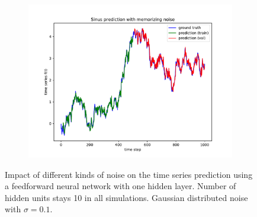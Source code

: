\documentclass{article}
\begin{document}
\begin{figure}
\begin{subfigure}{.35\textwidth}
    \includegraphics[width=\linewidth]{figures/plot_twolayer_memnoise.pdf}
  \end{subfigure}
  \caption{Impact of different kinds of noise on the time series prediction
  using a feedforward neural network with one hidden layer. Number of hidden
  units stays 10 in all simulations. Gaussian distributed noise with $\sigma = 
  0.1$.}
  \label{fig:noise_impact} 
\end{figure}
\end{document}
